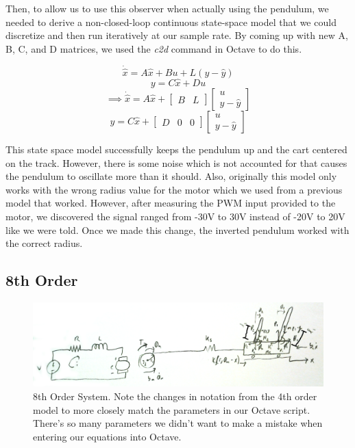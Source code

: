 \documentclass{article}
\begin{document}
Then, to allow us to use this observer when actually using the pendulum, we needed to derive a non-closed-loop continuous state-space model that we could discretize and then run iteratively at our sample rate. By coming up with new A, B, C, and D matrices, we used the \textit{c2d} command in Octave to do this.

\begin{equation*}
\dot{\hat{x}} = A \hat{x} + B u + L(y - \hat{y})
\end{equation*}
\begin{equation*}
y = C \hat{x} + D u
\end{equation*}
\begin{equation*}
\implies \dot{\hat{x}} = A \hat{x} + \begin{bmatrix}
B & L
\end{bmatrix} \begin{bmatrix}
u \\
y - \hat{y}
\end{bmatrix}
\end{equation*}
\begin{equation*}
y = C \hat{x} + \begin{bmatrix}
D & 0 & 0
\end{bmatrix} \begin{bmatrix}
u \\
y - \hat{y}
\end{bmatrix}
\end{equation*}

This state space model successfully keeps the pendulum up and the cart centered on the track. However, there is some noise which is not accounted for that causes the pendulum to oscillate more than it should. Also, originally this model only works with the wrong radius value for the motor which we used from a previous model that worked. However, after measuring the PWM input provided to the motor, we discovered the signal ranged from -30V to 30V instead of -20V to 20V like we were told. Once we made this change, the inverted pendulum worked with the correct radius.

\subsection{8th Order}
\begin{figure}[!htb]
\centering
\includegraphics[width=0.95\linewidth]{System8thOrder}
\caption{8th Order System. Note the changes in notation from the 4th order model to more closely match the parameters in our Octave script. There's so many parameters we didn't want to make a mistake when entering our equations into Octave.}
\label{fig:8thOrder}
\end{figure}
\end{document}
